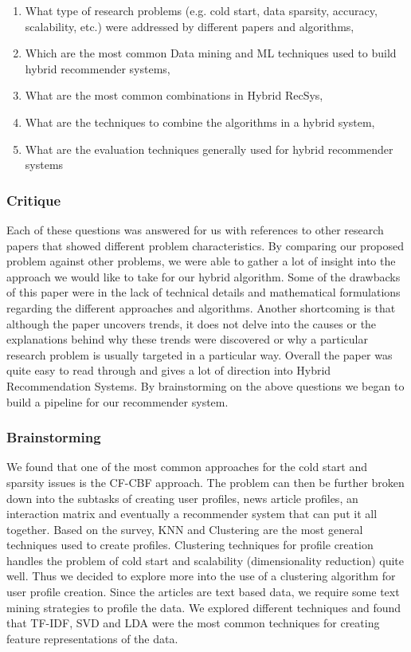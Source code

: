 \documentclass{article}
\begin{document}
\begin{enumerate}
    \item What type of research problems (e.g. cold start, data sparsity, accuracy, scalability, etc.) were addressed by different papers and algorithms,
    \item Which are the most common Data mining and ML techniques used to build hybrid recommender systems,
    \item What are the most common combinations in Hybrid RecSys,
    \item What are the techniques to combine the algorithms in a hybrid system,
    \item What are the evaluation techniques generally used for hybrid recommender systems
\end{enumerate}

\subsubsection{Critique}
Each of these questions was answered for us with references to other research papers that showed different problem characteristics. By comparing our proposed problem against other problems, we were able to gather a lot of insight into the approach we would like to take for our hybrid algorithm.  Some of the drawbacks of this paper were in the lack of technical details and mathematical formulations regarding the different approaches and algorithms. Another shortcoming is that although the paper uncovers trends, it does not delve into the causes or the explanations behind why these trends were discovered or why a particular research problem is usually targeted in a particular way.
Overall the paper was quite easy to read through and gives a lot of direction into Hybrid Recommendation Systems. By brainstorming on the above questions we began to build a pipeline for our recommender system.

\subsubsection{Brainstorming}
We found that one of the most common approaches for the cold start and sparsity issues is the CF-CBF approach. The problem can then be further broken down into the subtasks of creating user profiles, news article profiles, an interaction matrix and eventually a recommender system that can put it all together.
Based on the survey, KNN and Clustering are the most general techniques used to create profiles. Clustering techniques for profile creation handles the problem of cold start and scalability (dimensionality reduction) quite well. Thus we decided to explore more into the use of a clustering algorithm for user profile creation.
Since the articles are text based data, we require some text mining strategies to profile the data. We explored different techniques and found that TF-IDF, SVD and LDA were the most common techniques for creating feature representations of the data. 
\end{document}
